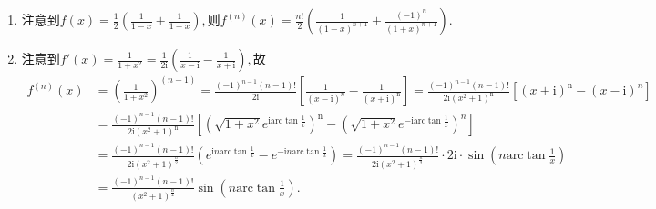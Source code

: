 \documentclass[../../main.tex]{subfiles}
\begin{document}
\begin{solution}
\begin{enumerate}[(1)]
\item 注意到$f\left( x \right) =\frac{1}{2}\left( \frac{1}{1-x}+\frac{1}{1+x} \right) ,$则$f^{\left( n \right)}\left( x \right) =\frac{n!}{2}\left( \frac{1}{\left( 1-x \right) ^{n+1}}+\frac{\left( -1 \right) ^n}{\left( 1+x \right) ^{n+1}} \right) .$

\item 注意到$f' \left( x \right) =\frac{1}{1+x^2}=\frac{1}{2\mathrm{i}}\left( \frac{1}{x-\mathrm{i}}-\frac{1}{x+\mathrm{i}} \right) ,$故
\begin{align*}
f^{\left( n \right)}\left( x \right) &=\left( \frac{1}{1+x^2} \right) ^{\left( n-1 \right)}=\frac{\left( -1 \right) ^{n-1}\left( n-1 \right) !}{2\mathrm{i}}\left[ \frac{1}{\left( x-\mathrm{i} \right) ^n}-\frac{1}{\left( x+\mathrm{i} \right) ^{\mathrm{n}}} \right] =\frac{\left( -1 \right) ^{n-1}\left( n-1 \right) !}{2\mathrm{i}\left( x^2+1 \right) ^{\mathrm{n}}}\left[ \left( x+\mathrm{i} \right) ^{\mathrm{n}}-\left( x-\mathrm{i} \right) ^n \right] 
\\
&=\frac{\left( -1 \right) ^{n-1}\left( n-1 \right) !}{2\mathrm{i}\left( x^2+1 \right) ^{\mathrm{n}}}\left[ \left( \sqrt{1+x^2}e^{\mathrm{iarc}\tan \frac{1}{x}} \right) ^{\mathrm{n}}-\left( \sqrt{1+x^2}e^{-\mathrm{iarc}\tan \frac{1}{x}} \right) ^n \right] 
\\
&=\frac{\left( -1 \right) ^{n-1}\left( n-1 \right) !}{2\mathrm{i}\left( x^2+1 \right) ^{\frac{n}{2}}}\left( e^{\mathrm{i}n\mathrm{arc}\tan \frac{1}{x}}-e^{-\mathrm{i}n\mathrm{arc}\tan \frac{1}{x}} \right) =\frac{\left( -1 \right) ^{n-1}\left( n-1 \right) !}{2\mathrm{i}\left( x^2+1 \right) ^{\frac{n}{2}}}\cdot 2\mathrm{i}\cdot \sin \left( n\mathrm{arc}\tan \frac{1}{x} \right) 
\\
&=\frac{\left( -1 \right) ^{n-1}\left( n-1 \right) !}{\left( x^2+1 \right) ^{\frac{n}{2}}}\sin \left( n\mathrm{arc}\tan \frac{1}{x} \right) .
\end{align*}
\end{enumerate}
\end{solution}
\end{document}
